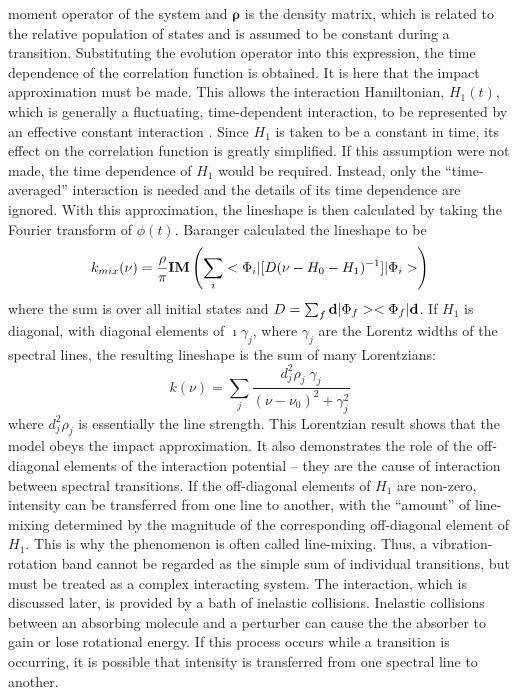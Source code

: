 \documentclass[11pt]{article}
\begin{document}
moment operator of the system and $\mathbf{\rho}$ is the density matrix, 
which is related to the relative population of states and is assumed to be 
constant during a transition.  Substituting the evolution operator into 
this expression, the time dependence of the correlation function is 
obtained. It is here that the impact approximation must be made. This 
allows the interaction
Hamiltonian, $H_{1}(t)$, which is generally a fluctuating, time-dependent
interaction, to be represented by an effective constant interaction
\cite{bar:58}.  Since $H_{1}$ is taken to be a constant in time, 
its effect on the correlation function is greatly simplified.  If this 
assumption were not made, the time dependence of $H_{1}$ would 
be required.  Instead, only the ``time-averaged''
interaction is needed and the details of its time dependence are
ignored.  With this approximation, the lineshape is then calculated by
taking the Fourier transform of $\phi(t)$.  Baranger \cite{bar:58}
calculated the lineshape to be
\begin{equation} k_{mix}(\nu)=\frac{\rho}{\pi} {\bf IM} \left(
\sum_{i}<\Phi_{i}|[D(\nu-H_{0}-H_{1})^{-1}]|\Phi_{i}>\right)
\end{equation}
where the sum is over all initial states and 
$D=\sum_{f}{\bf d}|\Phi_{f}><\Phi_{f}|{\bf d}$.  If $H_{1}$ is
diagonal, with diagonal elements of $\imath \gamma_{j}$, where
$\gamma_{j}$ are the Lorentz widths of the spectral lines, the
resulting lineshape is the sum of many Lorentzians:
\begin{equation} k(\nu)=\sum_{j} \frac{d_{j}^{2}\rho_{j} \; \gamma_{j}}
{(\nu-\nu_{0})^{2}+\gamma_{j}^{2}}
\end{equation}
where $d_{j}^{2}\rho_{j}$ is essentially the line strength. This Lorentzian
result shows that the model obeys the impact approximation.  It also
demonstrates the role of the off-diagonal elements of the interaction 
potential -- they are the cause of interaction between spectral 
transitions. If the off-diagonal elements of $H_{1}$ are non-zero, 
intensity can be transferred from one line to another, with the 
``amount'' of line-mixing determined by the magnitude of the 
corresponding off-diagonal element of
$H_{1}$.  This is why the phenomenon is often called line-mixing.  Thus, a
vibration-rotation band cannot be regarded as the simple sum of individual
transitions, but must be treated as a complex interacting system.  The
interaction, which is discussed later, is provided by a bath of inelastic
collisions.  Inelastic collisions between an absorbing molecule and a
perturber can cause the the absorber to gain or lose rotational energy.  If
this process occurs while a transition is occurring, it is possible that
intensity is transferred from one spectral line to another.
\end{document}
